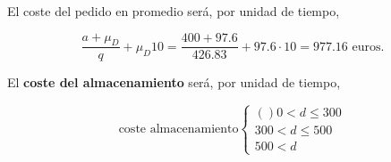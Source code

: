 \documentclass[a4paper,12pt]{article}
\begin{document}
El coste del pedido en promedio ser\'a, por unidad de tiempo,

$$ \dfrac{a + \mu_D}{q} + \mu_D 10 = \dfrac{400 + 97.6}{426.83} + 97.6\cdot 10 = 977.16 \text{ euros.} $$

El \textbf{coste del almacenamiento} ser\'a, por unidad de tiempo,

\begin{equation*}
\text{coste almacenamiento} \left\lbrace \begin{array}{l}
	() 0 < d \leq 300\\
	300 < d \leq 500 \\
	 500 < d
\end{array}
	\right.
\end{equation*}



	
\end{document}
